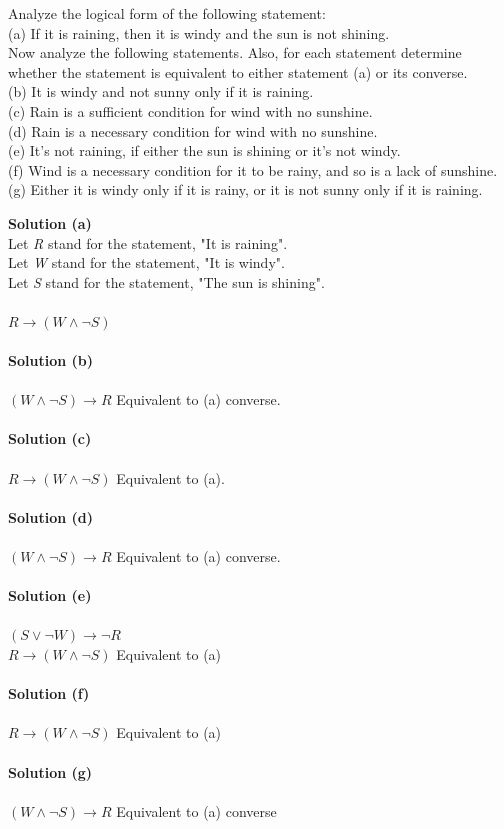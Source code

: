 \begin{tcolorbox}[title=Problem 3, breakable]
Analyze the logical form of the following statement: \\
(a) If it is raining, then it is windy and the sun is not shining. \\
Now analyze the following statements. Also, for each statement determine
whether the statement is equivalent to either statement (a) or its converse. \\
(b) It is windy and not sunny only if it is raining. \\
(c) Rain is a sufficient condition for wind with no sunshine. \\
(d) Rain is a necessary condition for wind with no sunshine. \\
(e) It's not raining, if either the sun is shining or it's not windy. \\
(f) Wind is a necessary condition for it to be rainy, and so is a lack of sunshine. \\
(g) Either it is windy only if it is rainy, or it is not sunny only if it is raining.
\end{tcolorbox}

\textbf{Solution (a)} \\
Let \textit{R} stand for the statement, "It is raining". \\
Let \textit{W} stand for the statement, "It is windy". \\
Let \textit{S} stand for the statement, "The sun is shining". \\ \\
$R \rightarrow (W \wedge \neg S)$ \\ \\
\textbf{Solution (b)} \\ \\
$(W \wedge \neg S) \rightarrow R$ Equivalent to (a) converse. \\ \\
\textbf{Solution (c)} \\ \\
$R \rightarrow (W \wedge \neg S)$ Equivalent to (a). \\ \\
\textbf{Solution (d)} \\ \\
$(W \wedge \neg S) \rightarrow R$ Equivalent to (a) converse. \\ \\
\textbf{Solution (e)} \\ \\
$(S \vee \neg W) \rightarrow \neg R$ \\
$R \rightarrow (W \wedge \neg S)$ Equivalent to (a) \\ \\
\textbf{Solution (f)} \\ \\
$R \rightarrow (W \wedge \neg S)$ Equivalent to (a) \\ \\
\textbf{Solution (g)} \\ \\
$(W \wedge \neg S) \rightarrow R$ Equivalent to (a) converse

